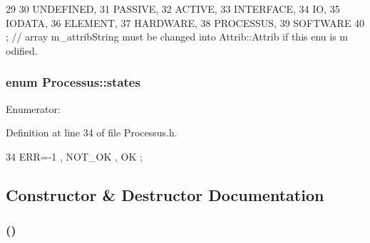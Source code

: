 \begin{DoxyCode}
29                 {
30     UNDEFINED,
31     PASSIVE,
32     ACTIVE,
33     INTERFACE,
34     IO,
35     IODATA,
36     ELEMENT,
37     HARDWARE,
38     PROCESSUS,
39     SOFTWARE 
40   }; // array m_attribString must be changed into Attrib::Attrib if this enu is m
      odified. 
\end{DoxyCode}
\hypertarget{classProcessus_a36278773bd98f2d5612fea40c7774821}{
\subsubsection[{states}]{\setlength{\rightskip}{0pt plus 5cm}enum {\bf Processus::states}}}
\label{classProcessus_a36278773bd98f2d5612fea40c7774821}
\begin{Desc}
\item[Enumerator: ]\par
\begin{description}
\item[{\em 
\hypertarget{classProcessus_a36278773bd98f2d5612fea40c7774821adaf73ad5d0a09f952d0f18dbbe1c7493}{
ERR}
\label{classProcessus_a36278773bd98f2d5612fea40c7774821adaf73ad5d0a09f952d0f18dbbe1c7493}
}]\item[{\em 
\hypertarget{classProcessus_a36278773bd98f2d5612fea40c7774821a629082f49d6e8df6b6da2b8fbb9d80fb}{
NOT\_\-OK}
\label{classProcessus_a36278773bd98f2d5612fea40c7774821a629082f49d6e8df6b6da2b8fbb9d80fb}
}]\item[{\em 
\hypertarget{classProcessus_a36278773bd98f2d5612fea40c7774821af77c64124fa175f28200166fff165ea2}{
OK}
\label{classProcessus_a36278773bd98f2d5612fea40c7774821af77c64124fa175f28200166fff165ea2}
}]\end{description}
\end{Desc}



Definition at line 34 of file Processus.h.


\begin{DoxyCode}
34 { ERR=-1 , NOT_OK , OK };
\end{DoxyCode}


\subsection{Constructor \& Destructor Documentation}
\hypertarget{classTestUSB_a4aae5a332f7484f9ef05296b638975c1}{
\subsubsection[{TestUSB}]{ ()}}
\label{classTestUSB_a4aae5a332f7484f9ef05296b638975c1}


